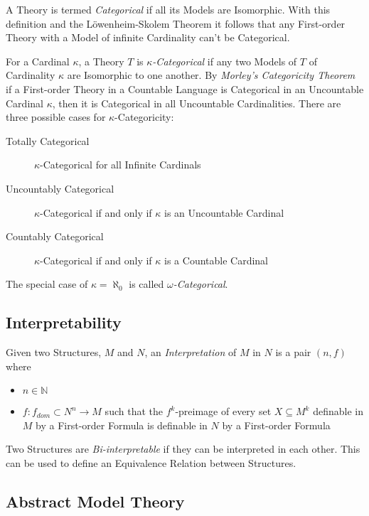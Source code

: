 \documentclass{article}
\begin{document}
A Theory is termed \emph{Categorical} if all its Models are
Isomorphic. With this definition and the L\"owenheim-Skolem Theorem it
follows that any First-order Theory with a Model of infinite
Cardinality can't be Categorical.

For a Cardinal $\kappa$, a Theory $T$ is \emph{$\kappa$-Categorical}
if any two Models of $T$ of Cardinality $\kappa$ are Isomorphic to one
another. By \emph{Morley's Categoricity Theorem}\cite{morley65} if a
First-order Theory in a Countable Language is Categorical in an
Uncountable Cardinal $\kappa$, then it is Categorical in all
Uncountable Cardinalities. There are three possible cases for
$\kappa$-Categoricity:
\begin{description}
\item[Totally Categorical] $\kappa$-Categorical for all Infinite
  Cardinals
\item[Uncountably Categorical] $\kappa$-Categorical if and only if
  $\kappa$ is an Uncountable Cardinal
\item[Countably Categorical] $\kappa$-Categorical if and only if
  $\kappa$ is a Countable Cardinal
\end{description}
The special case of $\kappa = \aleph_0$ is called
\emph{$\omega$-Categorical}.

\subsection{Interpretability}

Given two Structures, $M$ and $N$, an \emph{Interpretation} of $M$ in
$N$ is a pair $(n,f)$ where
\begin{itemize}
    \item $n \in \mathbb{N}$
    \item $f:f_{dom} \subset N^n \rightarrow M$ such that the
      $f^k$-preimage of every set $X \subseteq M^k$ definable in $M$
      by a First-order Formula is definable in $N$ by a First-order
      Formula
\end{itemize}

Two Structures are \emph{Bi-interpretable} if they can be interpreted
in each other. This can be used to define an Equivalence Relation
between Structures.

\subsection{Abstract Model Theory}
\end{document}
